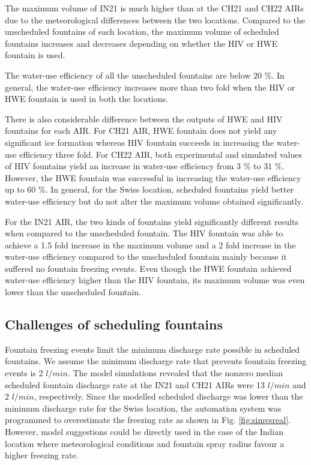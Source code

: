 \documentclass[tc, manuscript]{copernicus}
\begin{document}
The maximum volume of IN21 is much higher than at the CH21 and CH22 AIRs due to the meteorological differences
between the two locations. Compared to the unscheduled fountains of each location, the maximum volume of 
scheduled fountains increases and decreases depending on whether the HIV or HWE fountain is used. 

The water-use efficiency of all the unscheduled fountains are below 20 \%. In general, the water-use efficiency
increases more than two fold when the HIV or HWE fountain is used in both the locations.  

There is also considerable difference between the outputs of HWE and HIV fountains for each AIR. For CH21 AIR,
HWE fountain does not yield any significant ice formation whereas HIV fountain succeeds in increasing the
water-use efficiency three fold. For CH22 AIR, both experimental and simulated values of HIV fountains
yield an increase in water-use efficiency from 3 \% to 31 \%. However, the HWE fountain was successful in
increasing the water-use efficiency up to 60 \%. In general, for the Swiss location, scheduled fountains yield
better water-use efficiency but do not alter the maximum volume obtained significantly.

For the IN21 AIR, the two kinds of fountains yield significantly different results when compared to the
unscheduled fountain. The HIV fountain was able to achieve a 1.5 fold increase in the maximum volume and a 2
fold increase in the water-use efficiency compared to the unscheduled fountain mainly because it suffered no
fountain freezing events. Even though the HWE fountain achieved water-use efficiency higher than the HIV
fountain, its maximum volume was even lower than the unscheduled fountain.


\subsection{Challenges of scheduling fountains}

Fountain freezing events limit the minimum discharge rate possible in scheduled fountains.  We assume the
minimum discharge rate that prevents fountain freezing events is 2 $l/min$. The model simulations revealed that
the nonzero median scheduled fountain discharge rate at the IN21 and CH21 AIRs were 13 $l/min$ and 2 $l/min$,
respectively. Since the modelled scheduled discharge was lower than the minimum discharge rate for the Swiss
location, the automation system was programmed to overestimate the freezing rate as shown in Fig.
\ref{fig:simvsreal}. However, model suggestions could be directly used in the case of the Indian location where
meteorological conditions and fountain spray radius favour a higher freezing rate. 
\end{document}
